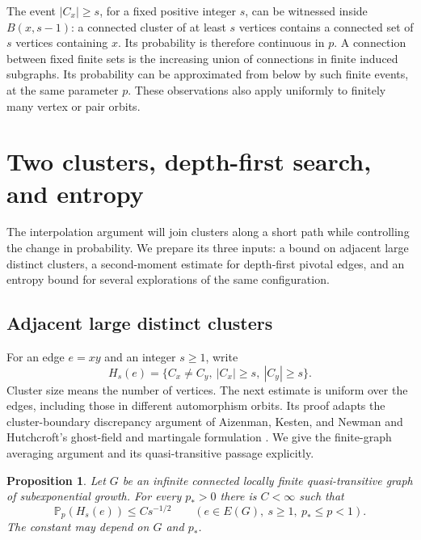 \documentclass[11pt]{article}
\newtheorem{proposition}[theorem]{Proposition}
\theoremstyle{definition}
\newcommand{\PP}{\mathbb P}
\begin{document}
The event $|C_x|\ge s$, for a fixed positive integer $s$, can be
witnessed inside $B(x,s-1)$: a connected cluster of at least $s$
vertices contains a connected set of $s$ vertices containing $x$.
Its probability is therefore continuous in $p$. A connection between
fixed finite sets is the increasing union of connections in finite
induced subgraphs. Its probability can be approximated from below
by such finite events, at the same parameter $p$. These observations
also apply uniformly to finitely many vertex or pair orbits.

\section{Two clusters, depth-first search, and entropy}
\label{sec:dfs-entropy}

The interpolation argument will join clusters along a short path while
controlling the change in probability. We prepare its three inputs: a
bound on adjacent large distinct clusters, a second-moment estimate for
depth-first pivotal edges, and an entropy bound for several explorations
of the same configuration.

\subsection{Adjacent large distinct clusters}

For an edge $e=xy$ and an integer $s\ge1$, write
\[
 H_s(e)=\{C_x\ne C_y,\ |C_x|\ge s,\ |C_y|\ge s\}.
\]
Cluster size means the number of vertices. The next estimate is uniform
over the edges, including those in different automorphism orbits.
Its proof adapts the cluster-boundary discrepancy argument of
Aizenman, Kesten, and Newman \cite[Section~3]{AizenmanKestenNewman1987}
and Hutchcroft's ghost-field and martingale formulation
\cite[Section~3]{Hutchcroft2020Locality}.
We give the finite-graph averaging argument and its quasi-transitive
passage explicitly.

\begin{proposition}\label{prop:two-cluster}
Let $G$ be an infinite connected locally finite quasi-transitive graph
of subexponential growth. For every $p_*>0$ there is $C<\infty$ such
that
\[
 \PP_p(H_s(e))\le C s^{-1/2}
 \qquad(e\in E(G),\ s\ge1,\ p_*\le p<1).
\]
The constant may depend on $G$ and $p_*$.
\end{proposition}
\end{document}
